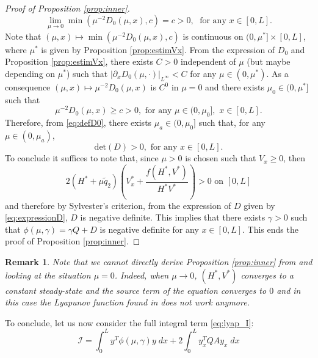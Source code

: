 \documentclass[11pt]{article}
\newtheorem{rmk}{Remark}[section]
\begin{document}
\begin{proof}[Proof of Proposition \ref{prop:inner}]
{\begin{equation}
\lim\limits_{\mu\rightarrow 0}\min(\mu^{-2}D_{0}(\mu,x),c) = c>0,\;\text{ for any }x\in[0,L].
\end{equation}
Note that $(\mu,x)\mapsto \min(\mu^{-2}D_{0}(\mu,x),c)$ is continuous on $(0,\mu^{*}]\times [0,L]$,  where $\mu^{*}$ is given by Proposition \ref{prop:estimVx}. From the expression of $D_{0}$ and Proposition \ref{prop:estimVx}, there exists $C>0$ independent of $\mu$ (but maybe depending on $\mu^{*}$) such that $|\partial_{x}D_{0}(\mu,\cdot)|_{L^{\infty}}<C$ for any $\mu\in(0,\mu^{*})$.
 As a consequence $(\mu,x) \mapsto \mu^{-2}D_{0}(\mu,x)$ is $C^{0}$ in $\mu=0$ and 
 there exists 
$\mu_{0}\in{(0,\mu^{*}]}$ 
such that 
\begin{equation}
    \mu^{-2}D_{0}(\mu,x) \geq c>0,\text{ for any }\mu\in(0,\mu_{0}],\,\,x\in[0,L].
\end{equation}
}
Therefore, {from \eqref{eq:defD0},} there exists $\mu_{{a}}\in{(0,\mu_{0}]}$ such that, for any $\mu\in(0,\mu_{{a}})$,
\begin{equation}
    \text{det}(D) >0,\text{ for any }x\in[0,L].
\end{equation}
To conclude it suffices to note that, since $\mu>0$ is chosen such that $V_{x}\geq 0$, then 
\begin{equation}
    { 2} ({H^{*}}+\mu \tilde{q}_{2})\left({V^{*}_{x}}+\frac{f({H^{*}},{V^{*}})}{{{H^{*}}V^{*}}}\right)>0\text{ on }[0,L]
\end{equation}
and therefore {by Sylvester's criterion}, from the expression of $D$ given by \eqref{eq:expressionD}, $D$ is negative definite. This implies that there exists $\gamma > 0$ such that $\phi(\mu{, \gamma}) = \gamma Q + D$ is negative definite for any $x\in[0,L]$. This ends the proof of Proposition \ref{prop:inner}.   

\end{proof}

\begin{rmk}
{Note that} we cannot directly derive Proposition \ref{prop:inner} from \cite{bastin2017quadratic} and looking at the situation $\mu=0$. Indeed, when $\mu\rightarrow 0$, $(H^{*},V^{*})$ converges to a constant steady-state and the source term of the equation converges to $0$ and in this case the Lyapunov function found in \cite{bastin2017quadratic} does not work anymore. 
\end{rmk}


To conclude, let us now consider the full integral term \eqref{eq:lyap_I}:
\begin{equation}
    \mathcal{I} = \int_{0}^{L} y^T \phi(\mu, \gamma) y \; dx + 2 \int_0^L y_x^T QA y_x \; dx
\end{equation}
\end{document}
